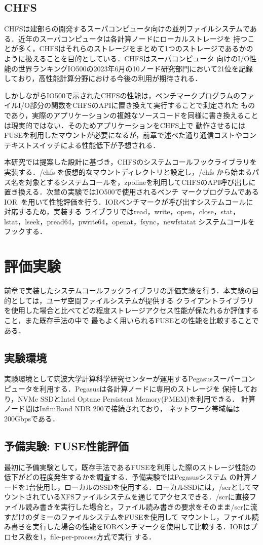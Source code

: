 \documentclass[a4paper，11pt]{jreport}
\begin{document}
\section{CHFS}
CHFSは建部らの開発するスーパコンピュータ向けの並列ファイルシステムである．近年のスーパコンピュータは各計算ノードにローカルストレージを
持つことが多く，CHFSはそれらのストレージをまとめて1つのストレージであるかのように扱えることを目的としている．CHFSはスーパコンピュータ
向けのI/O性能の世界ランキングIO500の2023年6月の10ノード研究部門において21位を記録しており，高性能計算分野における今後の利用が期待される．

しかしながらIO500で示されたCHFSの性能は，ベンチマークプログラムのファイルI/O部分の関数をCHFSのAPIに置き換えて実行することで測定された
ものであり，実際のアプリケーションの複雑なソースコードを同様に書き換えることは現実的ではない．そのためアプリケーションをCHFS上で
動作させるにはFUSEを利用したマウントが必要になるが，前章で述べた通り通信コストやコンテキストスイッチによる性能低下が予想される．

本研究では提案した設計に基づき，CHFSのシステムコールフックライブラリを実装する．/chfs を仮想的なマウントディレクトリと設定し，/chfs
から始まるパス名を対象とするシステムコールを，zpolineを利用してCHFSのAPI呼び出しに置き換える．次章の実験ではIO500で使用されるベンチ
マークプログラムであるIOR~\cite{ior}を用いて性能評価を行う．IORベンチマークが呼び出すシステムコールに対応するため，実装する
ライブラリではread，write，open，close，stat，lstat，lseek，pread64，pwrite64，openat，fsync，newfstatat システムコールを
フックする．
\chapter{評価実験}
前章で実装したシステムコールフックライブラリの評価実験を行う．本実験の目的としては，ユーザ空間ファイルシステムが提供する
クライアントライブラリを使用した場合と比べてどの程度ストレージアクセス性能が保たれるか評価すること，また既存手法の中で
最もよく用いられるFUSEとの性能を比較することである．

\section{実験環境}
実験環境として筑波大学計算科学研究センターが運用するPegasusスーパーコンピュータを利用する．Pegasusは各計算ノードに専用のストレージを
保持しており，NVMe SSDとIntel Optane Persistent Memory(PMEM)を利用できる． 計算ノード間はInfiniBand NDR 200で接続されており，
ネットワーク帯域幅は200Gbpsである．
\section{予備実験: FUSE性能評価}
最初に予備実験として，既存手法であるFUSEを利用した際のストレージ性能の低下がどの程度発生するかを調査する．予備実験ではPegasusシステム
の計算ノードを1台使用し，ローカルのSSDを使用する．ローカルSSDには，/scrとしてマウントされているXFSファイルシステムを通じてアクセスできる．/scrに直接ファイル読み書きを実行した場合と，ファイル読み書きの要求をそのまま/scrに流すだけのダミーのファイルシステムをFUSEを使用して
マウントし，ファイル読み書きを実行した場合の性能をIORベンチマークを使用して比較する．IORはプロセス数を1，file-per-process方式で実行
する．
\end{document}

